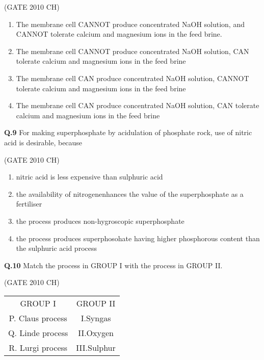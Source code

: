 \documentclass[journal,12pt,onecolumn]{exam}
\theoremstyle{remark}
\begin{document}
  \hfill{(GATE 2010 CH)}\\
   
   \begin{enumerate}
       \item The membrane cell CANNOT produce concentrated NaOH solution, and CANNOT tolerate calcium and magnesium ions in the feed brine.
       \item The membrane cell CANNOT produce concentrated NaOH solution, CAN tolerate calcium and magnesium ions in the feed brine
       \item  The membrane cell CAN produce concentrated NaOH solution, CANNOT tolerate calcium and magnesium ions in the feed brine 
       \item  The membrane cell CAN produce concentrated NaOH solution, CAN tolerate calcium and magnesium ions in the feed brine
   \end{enumerate}

   \noindent
   \textbf{Q.9}
   For making superphosphate by acidulation of phosphate rock, use of nitric acid is desirable, because
   
\hfill{(GATE 2010 CH)}\\

   \begin{enumerate}
       \item nitric acid is less expensive than sulphuric acid
       \item the availability of nitrogenenhances the value of the superphosphate as a fertiliser
       \item the process produces non-hygroscopic superphosphate
       \item the process produces superphosohate having higher phosphorous content than the sulphuric acid process
   \end{enumerate}


   \noindent
   \textbf{Q.10}
   Match the process in GROUP I with the process in GROUP II.

\hfill{(GATE 2010 CH)}\\
   
       \begin{tabular}{c|c}
       GROUP I & GROUP II \\
 P. Claus process & I.Syngas\\
 Q. Linde process & II.Oxygen\\
 R. Lurgi process & III.Sulphur\\
       \end{tabular}
\end{document}
